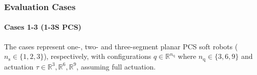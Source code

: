 



\subsubsection{Evaluation Cases}
\paragraph{Cases 1-3 (1-3S PCS)}
The cases represent one-, two- and three-segment planar \gls{PCS} soft robots ($n_\mathrm{s} \in \{ 1, 2, 3 \}$), respectively, with configurations $q \in \mathbb{R}^{n_\mathrm{q}}$ where $n_\mathrm{q} \in \{3, 6, 9 \}$ and actuation  $\tau \in \mathbb{R}^3, \mathbb{R}^6, \mathbb{R}^9$, assuming full actuation.

